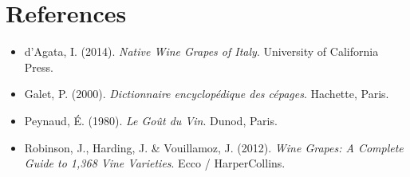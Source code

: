 \documentclass[11pt]{article}
\begin{document}
\section*{References}

\begin{itemize}[leftmargin=2em,itemsep=0.2em]
\item d'Agata, I. (2014). \emph{Native Wine Grapes of Italy}. University of California Press.
\item Galet, P. (2000). \emph{Dictionnaire encyclop\'edique des c\'epages}. Hachette, Paris.
\item Peynaud, \'E. (1980). \emph{Le Go\^ut du Vin}. Dunod, Paris.
\item Robinson, J., Harding, J. \& Vouillamoz, J. (2012). \emph{Wine Grapes: A Complete Guide to 1{,}368 Vine Varieties}. Ecco / HarperCollins.
\end{itemize}
\end{document}
